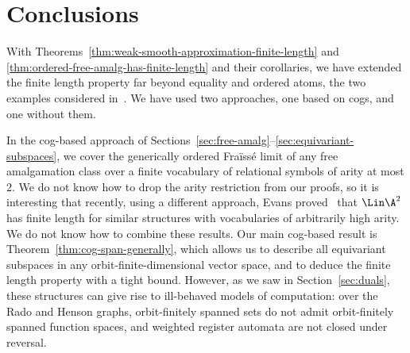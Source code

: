 \section{Conclusions}
With Theorems~\ref{thm:weak-smooth-approximation-finite-length} and \ref{thm:ordered-free-amalg-has-finite-length} and their corollaries, we have extended the finite length property far beyond equality and ordered atoms, the two examples considered in~\cite{BFKM24}. We have used two approaches, one based on cogs, and one without them.


 In the cog-based approach of Sections~\ref{sec:free-amalg}--\ref{sec:equivariant-subspaces}, we cover the generically ordered Fraïssé limit of any free amalgamation class over a finite vocabulary of relational symbols of arity at most $2$. We do not know how to drop the arity restriction from our proofs, so it is interesting that recently, using a different approach, Evans proved~\cite[Prop.~3.10]{Evans_pm1} that $\Lin \A^2$ has finite length for similar structures with  vocabularies of arbitrarily high arity. We do not know how to combine these results. 
Our main cog-based result is Theorem~\ref{thm:cog-span-generally}, 
which allows us to describe all equivariant subspaces in any orbit-finite-dimensional vector space, and to deduce the finite length property with a tight bound.
However, as we saw in Section~\ref{sec:duals}, these structures can give rise to ill-behaved models of computation:
over the Rado and Henson graphs, orbit-finitely spanned sets do not admit orbit-finitely spanned function spaces, and weighted register automata are not closed under reversal.

